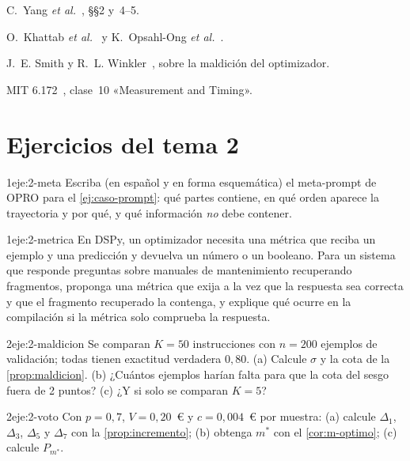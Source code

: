 \begin{lecturas}
\item C.~Yang \emph{et al.}~\cite{opro}, §§2 y~4--5.
\item O.~Khattab \emph{et al.}~\cite{dspy} y K.~Opsahl-Ong \emph{et al.}~\cite{mipro}.
\item J.~E. Smith y R.~L. Winkler~\cite{smith}, sobre la maldición del optimizador.
\item MIT 6.172~\cite{mit6172}, clase~10 «Measurement and Timing».
\end{lecturas}

\section*{Ejercicios del tema 2}

\begin{ejercicio}{1}{eje:2-meta}
Escriba (en español y en forma esquemática) el meta-prompt de OPRO para el \cref{ej:caso-prompt}: qué partes contiene, en qué orden aparece la trayectoria y por qué, y qué información \emph{no} debe contener.
\end{ejercicio}

\begin{ejercicio}{1}{eje:2-metrica}
En DSPy, un optimizador necesita una métrica que reciba un ejemplo y una predicción y devuelva un número o un booleano. Para un sistema que responde preguntas sobre manuales de mantenimiento recuperando fragmentos, proponga una métrica que exija a la vez que la respuesta sea correcta y que el fragmento recuperado la contenga, y explique qué ocurre en la compilación si la métrica solo comprueba la respuesta.
\end{ejercicio}

\begin{ejercicio}{2}{eje:2-maldicion}
Se comparan $K=50$ instrucciones con $n=200$ ejemplos de validación; todas tienen exactitud verdadera $0{,}80$. (a) Calcule $\sigma$ y la cota de la \cref{prop:maldicion}. (b) ¿Cuántos ejemplos harían falta para que la cota del sesgo fuera de 2 puntos? (c) ¿Y si solo se comparan $K=5$?
\end{ejercicio}

\begin{ejercicio}{2}{eje:2-voto}
Con $p=0{,}7$, $V=0{,}20$~€ y $c=0{,}004$~€ por muestra: (a) calcule $\Delta_1$, $\Delta_3$, $\Delta_5$ y $\Delta_7$ con la \cref{prop:incremento}; (b) obtenga $m^{*}$ con el \cref{cor:m-optimo}; (c) calcule $P_{m^{*}}$.
\end{ejercicio}

